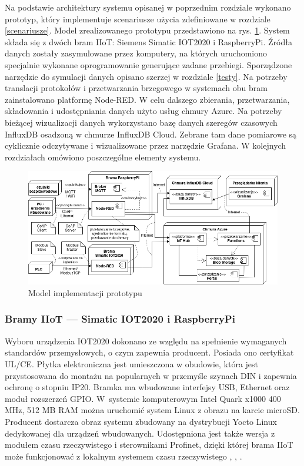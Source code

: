 \documentclass[a4paper, 12pt, twoside]{article}
\begin{document}
Na podstawie architektury systemu opisanej w poprzednim rozdziale wykonano
prototyp, który implementuje scenariusze użycia zdefiniowane w rozdziale \ref{scenariusze}.
Model zrealizowanego prototypu przedstawiono na rys. \ref{fig:impl}.
System składa się z dwóch bram IIoT: Siemens Simatic IOT2020 i RaspberryPi.
Źródła danych
zostały zasymulowane przez komputery, na których uruchomiono specjalnie wykonane oprogramowanie
generujące zadane przebiegi. Sporządzone narzędzie do symulacji danych opisano szerzej w rozdziale
\ref{testy}. Na potrzeby translacji protokołów
i przetwarzania brzegowego w systemach obu bram zainstalowano platformę Node-RED.
W celu dalszego zbierania, przetwarzania, składowania i udostępniania danych
użyto usług chmury Azure. Na potrzeby bieżącej wizualizacji danych wykorzystano
bazę danych szeregów czasowych InfluxDB osadzoną w chmurze InfluxDB Cloud.
Zebrane tam dane pomiarowe są cyklicznie odczytywane i wizualizowane przez narzędzie Grafana.
W kolejnych rozdziałach omówiono poszczególne elementy systemu.

\begin{figure}[h]
      \centering
      \includegraphics[width=\textwidth]{impl.png}
      \caption{Model implementacji prototypu}
      \label{fig:impl}
\end{figure}

\subsubsection{Bramy IIoT --- Simatic IOT2020 i RaspberryPi}

Wyboru urządzenia IOT2020 dokonano ze względu na spełnienie wymaganych standardów przemysłowych,
o czym zapewnia producent. Posiada ono certyfikat UL/CE. Płytka elektroniczna
jest umieszczona w obudowie, która jest przystosowana do montażu
na popularnych w przemyśle szynach DIN i zapewnia ochronę o stopniu IP20. Bramka
ma wbudowane interfejsy USB, Ethernet oraz moduł rozszerzeń GPIO. W~systemie
komputerowym Intel Quark x1000 400 MHz, 512 MB RAM można uruchomić system
Linux z obrazu na karcie microSD. Producent dostarcza obraz systemu zbudowany
na dystrybucji Yocto Linux dedykowanej dla urządzeń wbudowanych. Udostępniona
jest także wersja z modułem czasu rzeczywistego i sterownikami Profinet,
dzięki której brama IIoT może funkcjonować z lokalnym systemem czasu rzeczywistego
\cite{simatic-iot-sepc}, \cite{simatic-iot-profinet}, \cite{modbus-iot-gateway}.
\end{document}
